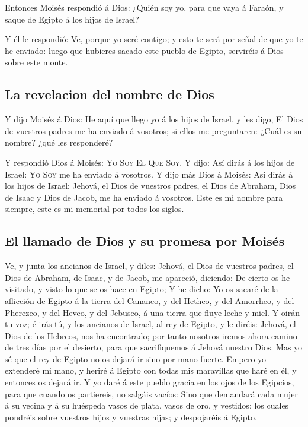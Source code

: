  Entonces Moisés respondió á Dios: ¿Quién soy yo, para
que vaya á Faraón, y saque de Egipto á los hijos de Israel?

 Y él le respondió: Ve, porque yo seré contigo; y esto te
será por señal de que yo te he enviado: luego que hubieres sacado este
pueblo de Egipto, serviréis á Dios sobre este monte.

\hypertarget{la-revelacion-del-nombre-de-dios}{%
\subsection{La revelacion del nombre de
Dios}\label{la-revelacion-del-nombre-de-dios}}

 Y dijo Moisés á Dios: He aquí que llego yo á los hijos
de Israel, y les digo, El Dios de vuestros padres me ha enviado á
vosotros; si ellos me preguntaren: ¿Cuál es su nombre? ¿qué les
responderé?

 Y respondió Dios á Moisés: \textsc{Yo} \textsc{Soy}
\textsc{El} \textsc{Que} \textsc{Soy}. Y dijo: Así dirás á los hijos de
Israel: \textsc{Yo} \textsc{Soy} me ha enviado á vosotros.
 Y dijo más Dios á Moisés: Así dirás á los hijos de
Israel: Jehová, el Dios de vuestros padres, el Dios de Abraham, Dios de
Isaac y Dios de Jacob, me ha enviado á vosotros. Este es mi nombre para
siempre, este es mi memorial por todos los siglos.

\hypertarget{el-llamado-de-dios-y-su-promesa-por-moisuxe9s}{%
\subsection{El llamado de Dios y su promesa por
Moisés}\label{el-llamado-de-dios-y-su-promesa-por-moisuxe9s}}

 Ve, y junta los ancianos de Israel, y diles: Jehová, el
Dios de vuestros padres, el Dios de Abraham, de Isaac, y de Jacob, me
apareció, diciendo: De cierto os he visitado, y visto lo que se os hace
en Egipto;  Y he dicho: Yo os sacaré de la aflicción de
Egipto á la tierra del Cananeo, y del Hetheo, y del Amorrheo, y del
Pherezeo, y del Heveo, y del Jebuseo, á una tierra que fluye leche y
miel.  Y oirán tu voz; é irás tú, y los ancianos de
Israel, al rey de Egipto, y le diréis: Jehová, el Dios de los Hebreos,
nos ha encontrado; por tanto nosotros iremos ahora camino de tres días
por el desierto, para que sacrifiquemos á Jehová nuestro Dios.
 Mas yo sé que el rey de Egipto no os dejará ir sino por
mano fuerte.  Empero yo extenderé mi mano, y heriré á
Egipto con todas mis maravillas que haré en él, y entonces os dejará ir.
 Y yo daré á este pueblo gracia en los ojos de los
Egipcios, para que cuando os partiereis, no salgáis vacíos:
 Sino que demandará cada mujer á su vecina y á su
huéspeda vasos de plata, vasos de oro, y vestidos: los cuales pondréis
sobre vuestros hijos y vuestras hijas; y despojaréis á Egipto.

